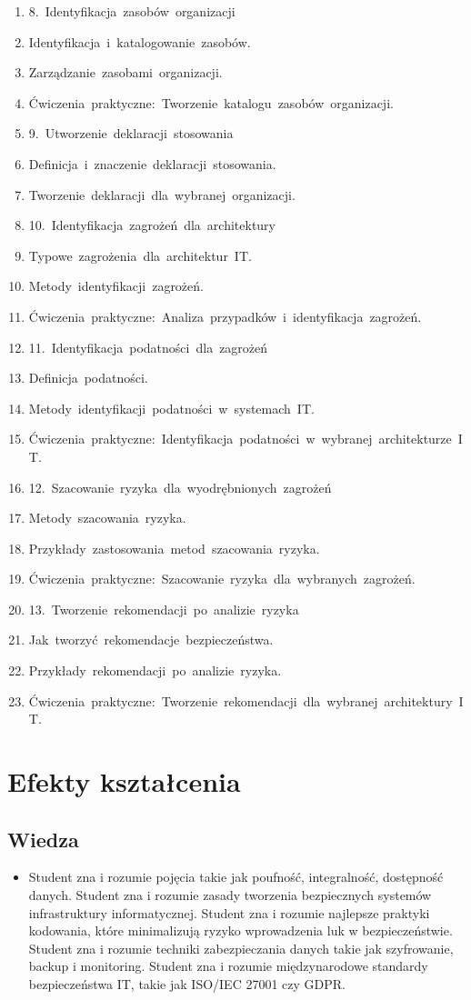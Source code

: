 \documentclass[12pt, a4paper]{article}
\begin{document}
\begin{enumerate}
  \item 8. Identyfikacja zasobów organizacji
  \item Identyfikacja i katalogowanie zasobów.
  \item Zarządzanie zasobami organizacji.
  \item Ćwiczenia praktyczne: Tworzenie katalogu zasobów organizacji.
  \item 9. Utworzenie deklaracji stosowania
  \item Definicja i znaczenie deklaracji stosowania.
  \item Tworzenie deklaracji dla wybranej organizacji.
  \item 10. Identyfikacja zagrożeń dla architektury
  \item Typowe zagrożenia dla architektur IT.
  \item Metody identyfikacji zagrożeń.
  \item Ćwiczenia praktyczne: Analiza przypadków i identyfikacja zagrożeń.
  \item 11. Identyfikacja podatności dla zagrożeń
  \item Definicja podatności.
  \item Metody identyfikacji podatności w systemach IT.
  \item Ćwiczenia praktyczne: Identyfikacja podatności w wybranej architekturze IT.
  \item 12. Szacowanie ryzyka dla wyodrębnionych zagrożeń
  \item Metody szacowania ryzyka.
  \item Przykłady zastosowania metod szacowania ryzyka.
  \item Ćwiczenia praktyczne: Szacowanie ryzyka dla wybranych zagrożeń.
  \item 13. Tworzenie rekomendacji po analizie ryzyka
  \item Jak tworzyć rekomendacje bezpieczeństwa.
  \item Przykłady rekomendacji po analizie ryzyka.
  \item Ćwiczenia praktyczne: Tworzenie rekomendacji dla wybranej architektury IT.
\end{enumerate}

\section{Efekty kształcenia}

\subsection*{Wiedza}
\begin{itemize}
  \item Student zna i rozumie pojęcia takie jak poufność, integralność, dostępność danych. Student zna i rozumie zasady tworzenia bezpiecznych systemów infrastruktury informatycznej. Student zna i rozumie najlepsze praktyki kodowania, które minimalizują ryzyko wprowadzenia luk w bezpieczeństwie. Student zna i rozumie techniki zabezpieczania danych takie jak szyfrowanie, backup i monitoring. Student zna i rozumie międzynarodowe standardy bezpieczeństwa IT, takie jak ISO/IEC 27001 czy GDPR.
\end{itemize}
\end{document}
